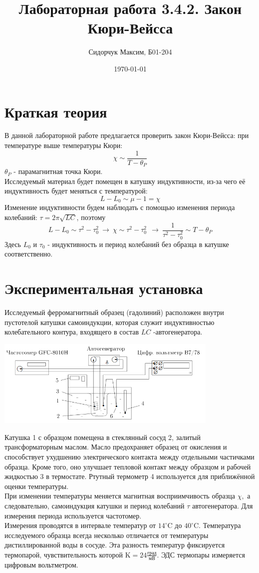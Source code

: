 \documentclass[a4paper, 12pt]{article}
\title{Лабораторная работа 3.4.2. Закон Кюри-Вейсса}
\author{Сидорчук Максим, Б01-204}
\date{\today}
\begin{document}
\maketitle

\section*{Краткая теория}
В данной лабораторной работе предлагается проверить закон Кюри-Вейсса: при температуре выше температуры Кюри:
\[\chi \sim \frac{1}{T - \theta_P}\]
$\theta_P$ - парамагнитная точка Кюри.\\
Исследуемый материал будет помещен в катушку индуктивности, из-за чего её индуктивность будет меняться с температурой:
\[L - L_0 \sim \mu - 1 = \chi\]
Изменение индуктивности будем наблюдать с помощью изменения периода колебаний: $\tau = 2\pi\sqrt{LC}$, поэтому
\[L - L_0 \sim \tau^2 - \tau_0^2 \ \rightarrow \ \chi \sim \tau^2 - \tau_0^2 \ \ \rightarrow \ \frac{1}{\tau^2 - \tau_0^2} \sim T - \theta_P\]
Здесь $L_0$ и $\tau_0$ - индуктивность и период колебаний без образца в катушке соответственно.
\section*{Экспериментальная установка}

Исследуемый ферромагнитный образец (гадолиний) расположен внутри пустотелой катушки самоиндукции, которая служит индуктивностью колебательного контура, входящего в состав $L C$ -автогенератора.

\begin{center}
    \includegraphics[width=0.8\textwidth]{1.png}
    \label{pic1}
\end{center}
Катушка 1 с образцом помещена в стеклянный сосуд 2, залитый трансформаторным маслом. Масло предохраняет образец от окисления и способствует ухудшению электрического контакта между отдельными частичками образца. Кроме того, оно улучшает тепловой контакт между образцом и рабочей жидкостью 3 в термостате. Ртутный термометр 4 используется для приближённой оценки температуры.\\
При изменении температуры меняется магнитная восприимчивость образца $\chi,$ а следовательно, самоиндукция катушки и период колебаний $\tau$ автогенератора. Для измерения периода используется частотомер. \\
Измерения проводятся в интервале температур от $14^{\circ} \mathrm{C}$ до $40^{\circ} \mathrm{C} .$
Температура исследуемого образца всегда несколько отличается от температуры дистиллированной воды в сосуде. Эта разность температур фиксируется термопарой, чувствительность которой $\mathrm{K}=24\frac{\text{град}}{\text{мВ}}$. ЭДС термопары измеряется цифровым вольтметром.
\end{document}
